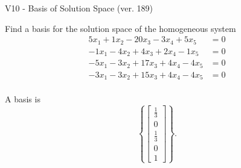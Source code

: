 \begin{exercise}
  \begin{exerciseTitle}V10 - Basis of Solution Space (ver. 189)\end{exerciseTitle}
  \begin{exerciseStatement}
    Find a basis for the solution space of the homogeneous system 
\begin{align*}
 5 x_ 1 + 1 x_ 2 -20 x_ 3 -3 x_ 4 + 5 x_ 5 &= 0  \\ 
  -1 x_ 1 -4 x_ 2 + 4 x_ 3 + 2 x_ 4 -1 x_ 5 &= 0  \\ 
  -5 x_ 1 -3 x_ 2 + 17 x_ 3 + 4 x_ 4 -4 x_ 5 &= 0  \\ 
  -3 x_ 1 -3 x_ 2 + 15 x_ 3 + 4 x_ 4 -4 x_ 5 &= 0  \\ 
 \end{align*}


 
  \end{exerciseStatement}

  \begin{exerciseAnswer}
   A basis is   
\[\left\{\left[\begin{array}{c}
\frac{1}{3} \\
0 \\
\frac{1}{3} \\
0 \\
1
\end{array}\right]\right\}.\]

  


  \end{exerciseAnswer}
\end{exercise}
